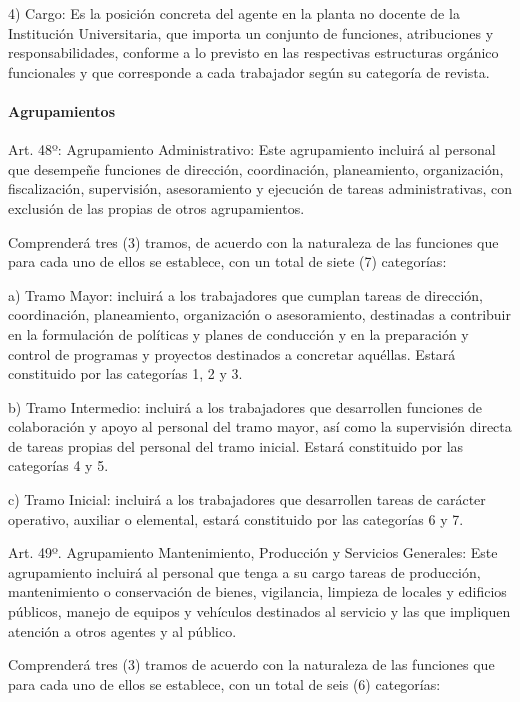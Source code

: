\documentclass[]{article}
\let\oldparagraph\paragraph
\renewcommand{\paragraph}[1]{\oldparagraph{#1}\mbox{}}
\begin{document}
4) Cargo: Es la posición concreta del agente en la planta no docente de
la Institución Universitaria, que importa un conjunto de funciones,
atribuciones y responsabilidades, conforme a lo previsto en las
respectivas estructuras orgánico funcionales y que corresponde a cada
trabajador según su categoría de revista.

\paragraph{Agrupamientos}\label{agrupamientos}

Art. 48º: Agrupamiento Administrativo: Este agrupamiento incluirá al
personal que desempeñe funciones de dirección, coordinación,
planeamiento, organización, fiscalización, supervisión, asesoramiento y
ejecución de tareas administrativas, con exclusión de las propias de
otros agrupamientos.

Comprenderá tres (3) tramos, de acuerdo con la naturaleza de las
funciones que para cada uno de ellos se establece, con un total de siete
(7) categorías:

a) Tramo Mayor: incluirá a los trabajadores que cumplan tareas de
dirección, coordinación, planeamiento, organización o asesoramiento,
destinadas a contribuir en la formulación de políticas y planes de
conducción y en la preparación y control de programas y proyectos
destinados a concretar aquéllas. Estará constituido por las categorías
1, 2 y 3.

b) Tramo Intermedio: incluirá a los trabajadores que desarrollen
funciones de colaboración y apoyo al personal del tramo mayor, así como
la supervisión directa de tareas propias del personal del tramo inicial.
Estará constituido por las categorías 4 y 5.

c) Tramo Inicial: incluirá a los trabajadores que desarrollen tareas de
carácter operativo, auxiliar o elemental, estará constituido por las
categorías 6 y 7.

Art. 49º. Agrupamiento Mantenimiento, Producción y Servicios Generales:
Este agrupamiento incluirá al personal que tenga a su cargo tareas de
producción, mantenimiento o conservación de bienes, vigilancia, limpieza
de locales y edificios públicos, manejo de equipos y vehículos
destinados al servicio y las que impliquen atención a otros agentes y al
público.

Comprenderá tres (3) tramos de acuerdo con la naturaleza de las
funciones que para cada uno de ellos se establece, con un total de seis
(6) categorías:
\end{document}
